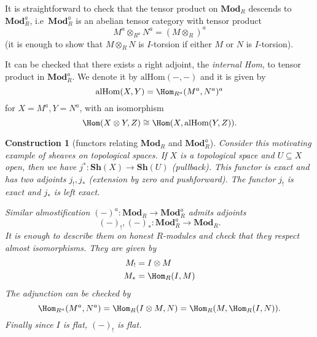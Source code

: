 \documentclass[a4paper]{article}
\renewcommand{\c}[1]{\mathbf{#1}}
\newcommand{\Mod}{{\c{Mod}}}
\newtheorem*{construction}{Construction}
\begin{document}
\begin{remark}
  It is straightforward to check that the tensor product on \(\Mod_R\) descends to \(\Mod_R^a\), i.e\ \(\Mod_R^a\) is an abelian tensor category with tensor product
  \[
    M^a \otimes_{R^a} N^a = (M \otimes_R)^a
  \]
  (it is enough to show that \(M \otimes_R N\) is \(I\)-torsion if either \(M\) or \(N\) is \(I\)-torsion).
\end{remark}

\begin{remark}
  It can be checked that there exists a right adjoint, the \emph{internal Hom}, to tensor product in \(\Mod_R^a\). We denote it by \(\mathrm{alHom}(-, -)\) and it is given by
  \[
    \mathrm{alHom}(X, Y) = \Hom_{R^a}(M^a, N^a)^a
  \]
  for \(X = M^a, Y = N^a\), with an isomorphism
  \[
    \Hom(X \otimes Y, Z) \cong \Hom(X, \mathrm{alHom}(Y, Z)).
  \]
\end{remark}

\begin{construction}[functors relating \(\Mod_R\) and \(\Mod_R^a\)]
  Consider this motivating example of sheaves on topological spaces. If \(X\) is a topological space and \(U \subseteq X\) open, then we have \(j^*: \c{Sh}(X) \to \c{Sh}(U)\) (pullback). This functor is exact and has two adjoints \(j_!, j_*\) (extension by zero and pushforward). The functor \(j_!\) is exact and \(j_*\) is left exact.

  Similar almostification \((-)^a: \Mod_R \to \Mod_R^a\) admits adjoints
  \[
    (-)_!, (-)_*: \Mod_R^a \to \Mod_R.
  \]
  It is enough to describe them on honest \(R\)-modules and check that they respect almost isomorphisms. They are given by
  \begin{align*}
    M_! &= I \otimes M \\
    M_* &= \Hom_R(I, M)
  \end{align*}
  The adjunction can be checked by
  \[
    \Hom_{R^a}(M^a, N^a) = \Hom_R(I \otimes M, N) = \Hom_R(M, \Hom_R(I, N)).
  \]
  Finally since \(I\) is flat, \((-)_!\) is flat.
\end{construction}
\end{document}
